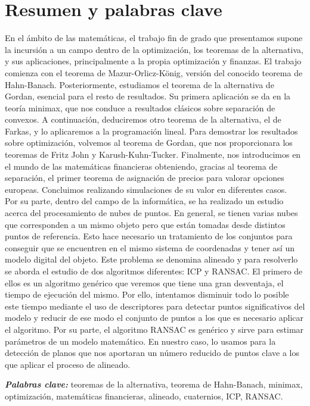 \chapter{Resumen y palabras clave}

En el ámbito de las matemáticas, el trabajo fin de grado que presentamos supone la incursión a un campo dentro de la optimización, los teoremas de la alternativa, y sus aplicaciones, principalmente a la propia optimización y finanzas. El trabajo comienza con el teorema de Mazur-Orlicz-König, versión del conocido teorema de Hahn-Banach. Posteriormente, estudiamos el teorema de la alternativa de Gordan, esencial para el resto de resultados. Su primera aplicación se da en la teoría minimax, que nos conduce a resultados clásicos sobre separación de convexos. A continuación, deduciremos otro teorema de la alternativa, el de Farkas, y lo aplicaremos a la programación lineal. Para demostrar los resultados sobre optimización, volvemos al teorema de Gordan, que nos proporcionara los teoremas de Fritz John y Karush-Kuhn-Tucker. Finalmente, nos introducimos en el mundo de las matemáticas financieras obteniendo, gracias al teorema de separación, el primer teorema de asignación de precios para valorar opciones europeas. Concluimos realizando simulaciones de su valor en diferentes casos.\\

Por su parte, dentro del campo de la informática, se ha realizado un estudio acerca del procesamiento de nubes de puntos. En general, se tienen varias nubes que corresponden a un mismo objeto pero que están tomadas desde distintos puntos de referencia. Esto hace necesario un tratamiento de los conjuntos para conseguir que se encuentren en el mismo sistema de coordenadas y tener así un modelo digital del objeto. Este problema se denomina alineado y para resolverlo se aborda el estudio de dos algoritmos diferentes: ICP y RANSAC. El primero de ellos es un algoritmo genérico que veremos que tiene una gran desventaja, el tiempo de ejecución del mismo. Por ello, intentamos disminuir todo lo posible este tiempo mediante el uso de descriptores para detectar puntos significativos del modelo y reducir de ese modo el conjunto de puntos a los que es necesario aplicar el algoritmo. Por su parte, el algoritmo RANSAC es genérico y sirve para estimar parámetros de un modelo matemático. En nuestro caso, lo usamos para la detección de planos que nos aportaran un número reducido de puntos clave a los que aplicar el proceso de alineado. \\

\providecommand{\pclave}[1]
{
	\small	
	\textbf{\textit{Palabras clave: }} #1
}
\pclave{teoremas de la alternativa, teorema de Hahn-Banach, minimax, optimización, matemáticas financieras, alineado, cuaternios, ICP, RANSAC.}